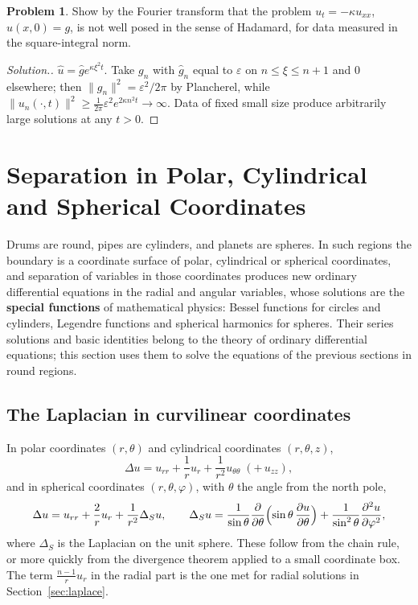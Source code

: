 \documentclass[11pt,a4paper]{article}
\numberwithin{equation}{section}
\theoremstyle{definition}
\newtheorem{problemx}{Problem}[subsection]
\newenvironment{problem}{\begin{problemx}}{\end{problemx}}
\newenvironment{solution}
  {\renewcommand{\qedsymbol}{}\begin{proof}[\textit{Solution}.]}
  {\end{proof}}
\begin{document}
\begin{problem}
Show by the Fourier transform that the problem $u_t = -\kappa u_{xx}$, $u(x, 0) = g$, is not well posed in the sense of Hadamard, for data measured in the square-integral norm.
\end{problem}

\begin{solution}
$\hat u = \hat ge^{\kappa\xi^2t}$. Take $g_n$ with $\hat g_n$ equal to $\varepsilon$ on $n \leq \xi \leq n + 1$ and $0$ elsewhere; then $\|g_n\|^2 = \varepsilon^2/2\pi$ by Plancherel, while $\|u_n(\cdot, t)\|^2 \geq \frac1{2\pi}\varepsilon^2e^{2\kappa n^2t} \to \infty$. Data of fixed small size produce arbitrarily large solutions at any $t > 0$.
\end{solution}

\section{Separation in Polar, Cylindrical and Spherical Coordinates}
\label{sec:curvilinear}

Drums are round, pipes are cylinders, and planets are spheres. In such regions the boundary is a coordinate surface of polar, cylindrical or spherical coordinates, and separation of variables in those coordinates produces new ordinary differential equations in the radial and angular variables, whose solutions
are the \textbf{special functions} of mathematical physics: Bessel functions for circles and cylinders, Legendre functions and spherical harmonics for spheres. Their series solutions and basic identities belong to the theory of ordinary differential equations; this section uses them to solve the equations of the
previous sections in round regions.

\subsection{The Laplacian in curvilinear coordinates}
\label{ssec:curvilaplacian}

In polar coordinates $(r, \theta)$ and cylindrical coordinates $(r, \theta, z)$,
\[
\Delta u = u_{rr} + \frac1ru_r + \frac1{r^2}u_{\theta\theta} \;(+\,u_{zz}) ,
\]
and in spherical coordinates $(r, \theta, \varphi)$, with $\theta$ the angle from the north pole,
\[
\Delta u = u_{rr} + \frac2ru_r + \frac1{r^2}\Delta_Su, \qquad \Delta_Su = \frac1{\sin\theta}\frac{\partial}{\partial\theta}\Bigl(\sin\theta\,\frac{\partial u}{\partial\theta}\Bigr) + \frac1{\sin^2\theta}\frac{\partial^2u}{\partial\varphi^2} ,
\]
where $\Delta_S$ is the Laplacian on the unit sphere. These follow from the chain rule, or more quickly from the divergence theorem applied to a small coordinate box. The term $\frac{n - 1}ru_r$ in the radial part is the one met for radial solutions in Section~\ref{sec:laplace}.
\end{document}
